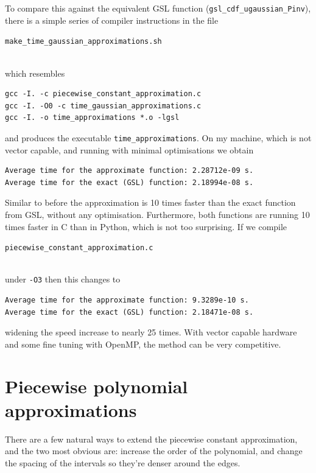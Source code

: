 \documentclass[11pt,a4paper,oneside,english]{extarticle}
\newcommand{\singlecodeline}[1]{\\[1em]\centerline{\lstinline[basicstyle=\ttfamily]$#1$}\\[1em]}
\begin{document}
To compare this against the equivalent GSL function (\verb|gsl_cdf_ugaussian_Pinv|), there is a simple series of compiler instructions in the file \singlecodeline{make_time_gaussian_approximations.sh} which resembles 
\begin{verbatim}
gcc -I. -c piecewise_constant_approximation.c
gcc -I. -O0 -c time_gaussian_approximations.c
gcc -I. -o time_approximations *.o -lgsl
\end{verbatim}
and produces the executable \verb|time_approximations|. On my machine, which is not vector capable, and running with minimal optimisations we obtain
\begin{verbatim}
Average time for the approximate function: 2.28712e-09 s.
Average time for the exact (GSL) function: 2.18994e-08 s.
\end{verbatim}
Similar to before the approximation is 10 times faster than the exact function from GSL, without any optimisation. Furthermore, both functions are running 10 times faster in C than in Python, which is not too surprising. If we compile \singlecodeline{piecewise_constant_approximation.c}
under \verb|-O3| then this changes to 
\begin{verbatim}
Average time for the approximate function: 9.3289e-10 s.
Average time for the exact (GSL) function: 2.18471e-08 s.
\end{verbatim}
widening the speed increase to nearly 25 times. With vector capable hardware and some fine tuning with OpenMP, the method can be very competitive. 


\section{Piecewise polynomial approximations}


There are a few natural ways to extend the piecewise constant approximation, and the two most obvious are: increase the order of the polynomial, and change the spacing of the intervals so they're denser around the edges. 
\end{document}
